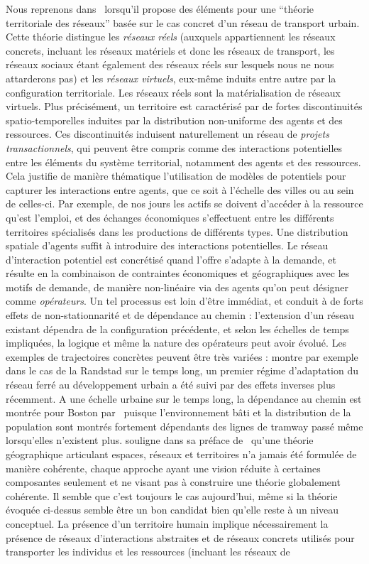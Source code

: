 {}{
Nous reprenons  dans~\cite{dupuy1987vers} lorsqu'il propose des éléments pour une ``théorie territoriale des réseaux'' basée sur le cas concret d'un réseau de transport urbain. Cette théorie distingue les \emph{réseaux réels} (auxquels appartiennent les réseaux concrets, incluant les réseaux matériels et donc les réseaux de transport, les réseaux sociaux étant également des réseaux réels sur lesquels nous ne nous attarderons pas) et les \emph{réseaux virtuels}, eux-même induits entre autre par la configuration territoriale. Les réseaux réels sont la matérialisation de réseaux virtuels. Plus précisément, un territoire est caractérisé par de fortes discontinuités spatio-temporelles induites par la distribution non-uniforme des agents et des ressources. Ces discontinuités induisent naturellement un réseau de \emph{projets transactionnels}, qui peuvent être compris comme des interactions potentielles entre les éléments du système territorial, notamment des agents et des ressources. Cela justifie de manière thématique l'utilisation de modèles de potentiels pour capturer les interactions entre agents, que ce soit à l'échelle des villes ou au sein de celles-ci. Par exemple, de nos jours les actifs se doivent d'accéder à la ressource qu'est l'emploi, et des échanges économiques s'effectuent entre les différents territoires spécialisés dans les productions de différents types. Une distribution spatiale d'agents suffit à introduire des interactions potentielles. Le réseau d'interaction potentiel est concrétisé quand l'offre s'adapte à la demande, et résulte en la combinaison de contraintes économiques et géographiques avec les motifs de demande, de manière non-linéaire via des agents qu'on peut désigner comme \emph{opérateurs}. Un tel processus est loin d'être immédiat, et conduit à de forts effets de non-stationnarité et de dépendance au chemin : l'extension d'un réseau existant dépendra de la configuration précédente, et selon les échelles de temps impliquées, la logique et même la nature des opérateurs peut avoir évolué. Les exemples de trajectoires concrètes peuvent être très variées : \cite{kasraian2015development} montre par exemple dans le cas de la Randstad sur le temps long, un premier régime d'adaptation du réseau ferré au développement urbain a été suivi par des effets inverses plus récemment. A une échelle urbaine sur le temps long, la dépendance au chemin est montrée pour Boston par~\cite{block2012hysteresis} puisque l'environnement bâti et la distribution de la population sont montrés fortement dépendants des lignes de tramway passé même lorsqu'elles n'existent plus.  souligne dans sa préface de~\cite{offner1996reseaux} qu'une théorie géographique articulant espaces, réseaux et territoires n'a jamais été formulée de manière cohérente, chaque approche ayant une vision réduite à certaines composantes seulement et ne visant pas à construire une théorie globalement cohérente. Il semble que c'est toujours le cas aujourd'hui, même si la théorie évoquée ci-dessus semble être un bon candidat bien qu'elle reste à un niveau conceptuel. La présence d'un territoire humain implique nécessairement la présence de réseaux d'interactions abstraites et de réseaux concrets utilisés pour transporter les individus et les ressources (incluant les réseaux de }
